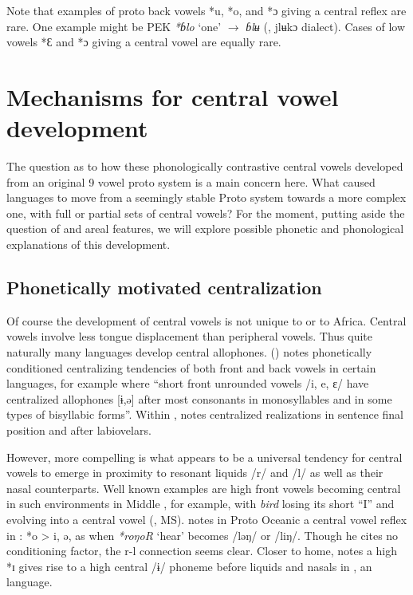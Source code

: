 \documentclass[output=paper,newtxmath,modfonts,nonflat]{langsci/langscibook}
\begin{document}
Note that examples of proto back vowels *u, *o, and *ɔ giving a central reflex are rare.  One example might be PEK \textit{*ɓlo} ‘one’ $\rightarrow$ \textit{ɓlʉ}  (, jlʉkɔ dialect). Cases of low vowels *Ɛ and *ɔ giving a central vowel are equally rare.

\newpage 
\section{Mechanisms for central vowel development}\label{sec:zogbo:4}

The question as to how these phonologically contrastive central vowels developed from an original 9 vowel proto system is a main concern here. What caused languages to move from a seemingly stable Proto system towards a more complex one, with full or partial sets of central vowels? For the moment, putting aside the question of  and areal features, we will explore possible phonetic and phonological explanations of this development. 

\subsection{Phonetically motivated centralization}\label{sec:zogbo:4.1}

Of course the development of central vowels is not unique to  or to Africa. Central vowels involve less tongue displacement than peripheral vowels. Thus quite naturally many languages develop central allophones. \citeauthor{Welmers1973} (\citeyear[23, 25]{Welmers1973}) notes phonetically conditioned centralizing tendencies of both front and back vowels in certain  languages, for example  where “short front unrounded vowels /i, e, ɛ/ have centralized allophones [ɨ,ə] after most consonants in monosyllables and in some types of bisyllabic forms”. Within , \citet{Bentinck1978} notes centralized realizations in sentence final position and after labiovelars.

However, more compelling is what appears to be a universal tendency for central vowels to emerge in proximity to resonant liquids /r/ and /l/ as well as their nasal counterparts.  Well known examples are high front vowels becoming central in such environments in Middle , for example, with \textit{bird} losing its short “I” and evolving into a central vowel (\citeauthor{hickeyms}, MS). \citet[76]{Lynch2015} notes in Proto Oceanic a central vowel reflex in : *o > i, ə, as when \textit{*roŋoR} ‘hear’ becomes /ləŋ/ or /liŋ/.  Though he cites no conditioning factor, the r-l connection seems clear. Closer to home, \citet{Morton2012} notes a high *ɪ gives rise to a high central /ɨ/ phoneme before liquids and nasals in , an  language.  
\end{document}
